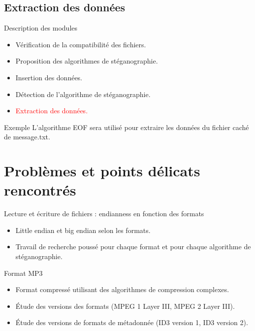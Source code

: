 \documentclass{beamer}
\begin{document}
  \subsection{Extraction des données}
  \begin{frame} %
	\begin{block}{Description des modules}
	\begin{itemize}
	[circle]
	\item Vérification de la compatibilité des fichiers.
	\item Proposition des algorithmes de stéganographie.
	\item Insertion des données.
	\item Détection de l'algorithme de stéganographie.
	\item \textcolor{red}{Extraction des données.}
	\end{itemize}
	\end{block}
	
	\begin{exampleblock}{Exemple} 
	L'algorithme EOF sera utilisé pour extraire les  données du fichier 
	caché de message.txt. 
	\end{exampleblock}
  \end{frame}
  	

  \section{Problèmes et points délicats rencontrés} 
  
  \begin{frame}
  
	\begin{block}{Lecture et écriture de fichiers : endianness en fonction des formats}
	\begin{itemize}
	[circle]

	\item Little endian et big endian selon les formats. 
	\item Travail de recherche poussé pour chaque format et pour chaque 
	algorithme de stéganographie.
	\end{itemize}
	\end{block}
		
	\begin{block}{Format MP3}
	\begin{itemize}
	[circle]
	\item Format compressé utilisant des algorithmes de compression complexes.
	\item Étude des versions des formats (MPEG 1 Layer III, MPEG 2 Layer III). 
	\item Étude des versions de formats de métadonnée (ID3 version 1, ID3 version 2). 
	\end{itemize}
	\end{block}
	
	\end{frame}
  
\end{document}
